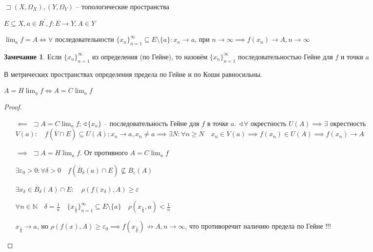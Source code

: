 \documentclass{book}
\newcommand\N{\ensuremath{\mathbb{N}}}
\newcommand{\p}[1]{#1^{\prime}}
\theoremstyle{definition}
\newtheorem*{note}{Замечание}
\begin{document}
\begin{definition}
    [по Гейне]
    $\sqsupset (X, \Omega_X), (Y, \Omega_Y)$ -- топологические пространства

    $E\subseteq X, a\in \p R, f:E\to Y, A\in Y$

    $\lim_a f=A\iff \forall $ последовательности $\{x_{n} \}_{n=1}^{\infty }\subseteq E\setminus \{a\}: x_{n} \to a$, при $n\to \infty  \implies  f(x_n) \to A, n\to \infty $
\end{definition}

\begin{note}
    Если $\{x_{n}\}_{n=1}^{\infty }$ из определения (по Гейне), то назовём $\{x_{n} \}_{n=1}^{\infty }$ последовательностью Гейне для $f$ и точки  $a$
\end{note}

\begin{theorem}
    В метрических пространствах определения предела по Гейне и по Коши равносильны.

    $A = H\lim_af \iff A =C\lim_af $
\end{theorem}
\begin{proof}
    \begin{itemize}
        \item []
        \item [$\impliedby $] $\sqsupset A = C\lim_af; \sphericalangle \{x_{n} \}$ -- последовательность Гейне для $f$  в точке  $a$.  $\sphericalangle \forall $ окрестность $U(A) \implies \exists $ окрестность $V(a):\quad f\left( \overset{\cdot }V\cap E \right) \subseteq U(A); x_{n} \to a, x_{n} \neq a \implies \exists N: \forall n\geqslant N\quad x_{n} \in \overset{\cdot }V(a) \implies  f(x_{n} )\in U(A) \implies f(x_{n} )\to A$
        \item [$\implies $] $\sqsupset A = H\lim_af$. От противного  $A = C\lim_af$

            $\exists \varepsilon_0>0:\forall \delta>0\quad f\left(\overset{\cdot }B_{\delta}(a) \cap E \right)\not\subseteq B_{\varepsilon}(A) $ 

            $\exists x_{\delta}\in \overset{\cdot }B_{\delta}(A)\cap E:\quad \rho\left( f(x_{\delta}), A \right) \geqslant \varepsilon$

            $\forall n\in \N \quad \delta = \frac{1}{n}\quad \{x_{\frac{1}{n}}\}_{n=1}^{\infty }\subseteq E\setminus \{a\}\quad \rho\left( x_{\frac{1}{n}}, a \right) <\frac{1}{n}$ 

                $x_{\frac{1}{n}}\to a$, но $\rho\left( f(x), A \right) \geqslant \varepsilon_0 \implies f\left( x_{\frac{1}{n}} \right) \not\to A, n\to \infty $, что противоречит наличию предела по Гейне !!!
    \end{itemize}
\end{proof}
\end{document}
